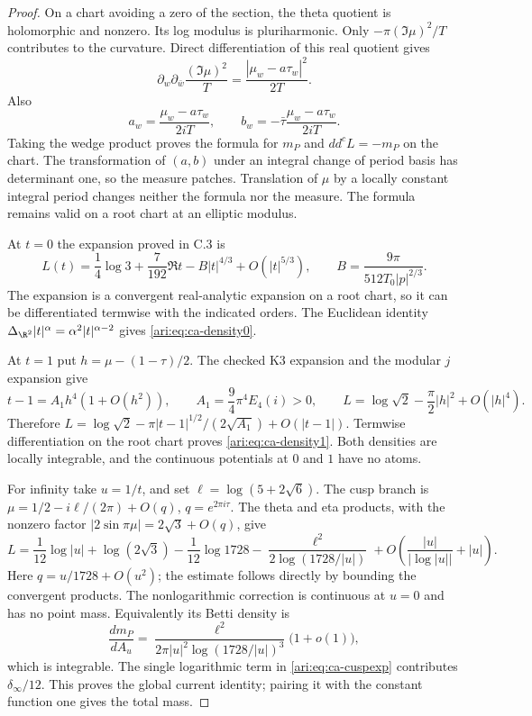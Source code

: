 \begin{proof}
On a chart avoiding a zero of the section, the theta quotient
is holomorphic and nonzero. Its log modulus is pluriharmonic.
Only $-\pi(\Im\mu)^2/T$ contributes to the curvature.
Direct differentiation of this real quotient gives
\[
 \partial_w\partial_{\bar w}\frac{(\Im\mu)^2}{T}
       =\frac{|\mu_w-a\tau_w|^2}{2T}.
\]
Also
\[
 a_w=\frac{\mu_w-a\tau_w}{2iT},\qquad
 b_w=-\bar\tau\frac{\mu_w-a\tau_w}{2iT}.
\]
Taking the wedge product proves the formula for $m_P$ and
$dd^cL=-m_P$ on the chart. The transformation of $(a,b)$
under an integral change of period basis has determinant one,
so the measure patches. Translation of $\mu$ by a locally
constant integral period changes neither the formula nor
the measure. The formula remains valid on a root chart
at an elliptic modulus.

At $t=0$ the expansion proved in C.3 is
\[
 L(t)=\frac14\log3+\frac7{192}\Re t
       -B|t|^{4/3}+O(|t|^{5/3}),\qquad
 B=\frac{9\pi}{512T_0|p|^{2/3}}.
\]
The expansion is a convergent real-analytic expansion on a
root chart, so it can be differentiated termwise with the
indicated orders. The Euclidean identity
$\Delta_{\R^2}|t|^\alpha=\alpha^2|t|^{\alpha-2}$ gives
\eqref{ari:eq:ca-density0}.

At $t=1$ put $h=\mu-(1-\tau)/2$. The checked K3 expansion
and the modular $j$ expansion give
\[
 t-1=A_1h^4(1+O(h^2)),\qquad
 A_1=\frac94\pi^4E_4(i)>0,\qquad
 L=\log\sqrt2-\frac\pi2|h|^2+O(|h|^4).
\]
Therefore
$L=\log\sqrt2-\pi|t-1|^{1/2}/(2\sqrt{A_1})+O(|t-1|)$.
Termwise differentiation on the root chart proves
\eqref{ari:eq:ca-density1}. Both densities are locally integrable,
and the continuous potentials at $0$ and $1$ have no atoms.

For infinity take $u=1/t$, and set $\ell=\log(5+2\sqrt6)$.
The cusp branch is
$\mu=1/2-i\ell/(2\pi)+O(q)$, $q=e^{2\pi i\tau}$.
The theta and eta products, with the nonzero factor
$|2\sin\pi\mu|=2\sqrt3+O(q)$, give
\begin{equation}\label{ari:eq:ca-cuspexp}
 L=\frac1{12}\log|u|+\log(2\sqrt3)-\frac1{12}\log1728
          -\frac{\ell^2}{2\log(1728/|u|)}
          +O\left(\frac{|u|}{|\log|u||}+|u|\right).
\end{equation}
Here $q=u/1728+O(u^2)$; the estimate follows directly by
bounding the convergent products. The nonlogarithmic
correction is continuous at $u=0$ and has no point mass.
Equivalently its Betti density is
\[
 \frac{dm_P}{dA_u}
  =\frac{\ell^2}{2\pi|u|^2\log(1728/|u|)^3}
       \bigl(1+o(1)\bigr),
\]
which is integrable. The single logarithmic term in
\eqref{ari:eq:ca-cuspexp} contributes $\delta_\infty/12$.
This proves the global current identity; pairing it with
the constant function one gives the total mass.
\end{proof}

